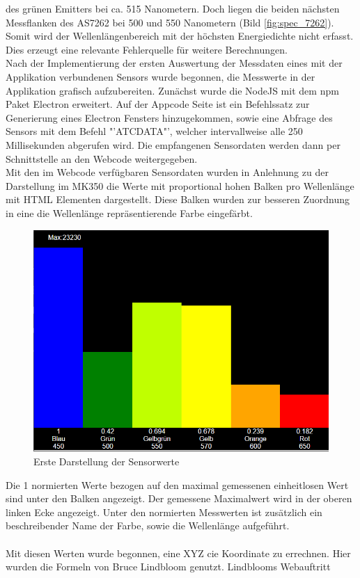 \documentclass[11pt]{scrartcl}
\begin{document}
des grünen Emitters bei ca. 515 Nanometern. Doch liegen die beiden nächsten Messflanken des AS7262 bei 500 und 550 Nanometern (Bild \ref{fig:spec_7262}).
Somit wird der Wellenlängenbereich mit der höchsten Energiedichte nicht erfasst. Dies erzeugt eine relevante Fehlerquelle für weitere
Berechnungen.\\
Nach der Implementierung der ersten Auswertung der Messdaten eines mit der Applikation verbundenen Sensors wurde begonnen, die Messwerte in der
Applikation grafisch aufzubereiten. Zunächst wurde die NodeJS mit dem \ac{npm} Paket Electron erweitert. Auf der Appcode Seite ist ein Befehlssatz
zur Generierung eines Electron Fensters hinzugekommen, sowie eine Abfrage des Sensors mit dem Befehl "'ATCDATA"', welcher intervallweise alle 250
Millisekunden abgerufen wird. Die empfangenen Sensordaten werden dann per Schnittstelle an den Webcode weitergegeben.\\
Mit den im Webcode verfügbaren Sensordaten wurden in Anlehnung zu der Darstellung im MK350 die Werte mit proportional hohen Balken pro Wellenlänge
mit HTML Elementen dargestellt. Diese Balken wurden zur besseren Zuordnung in eine die Wellenlänge repräsentierende Farbe eingefärbt.
\begin{figure}[H]
    \begin{center}
        \includegraphics[width=.6\textwidth]{images/app_dummy_spectrum.png}
    \end{center}
    \caption{Erste Darstellung der Sensorwerte}
\end{figure}
\noindent
Die 1 normierten Werte bezogen auf den maximal gemessenen einheitlosen Wert sind unter den Balken angezeigt. Der gemessene Maximalwert wird in der
oberen linken Ecke angezeigt. Unter den normierten Messwerten ist zusätzlich ein beschreibender Name der Farbe, sowie die Wellenlänge aufgeführt.\\
\\
Mit diesen Werten wurde begonnen, eine XYZ \ac{cie} Koordinate zu errechnen. Hier wurden die Formeln von Bruce Lindbloom genutzt. Lindblooms Webauftritt
\end{document}
